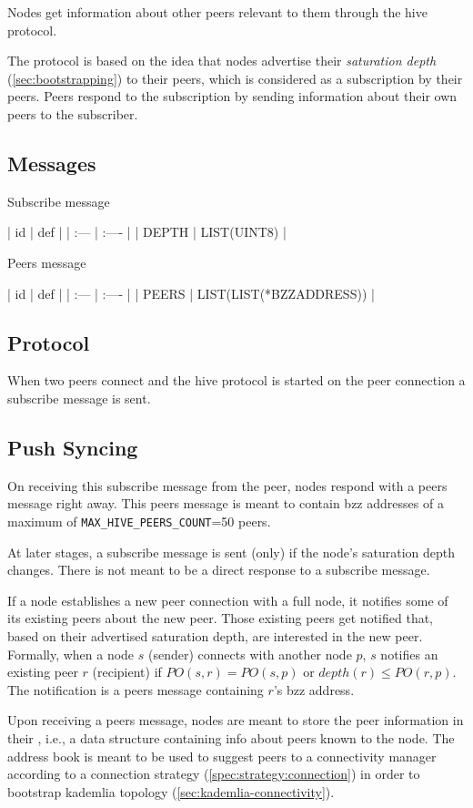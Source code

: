 
Nodes get information about other peers relevant to them through the hive protocol.

The protocol is based on the idea that nodes advertise their \emph{saturation  depth} (\ref{sec:bootstrapping}) to their peers, which is considered as a subscription by their peers. Peers respond to the subscription by sending information about their own peers to the subscriber.

\subsection{Messages}


\begin{definition}{Subscribe message}\label{def:hive-subscribe-msg}

| id | def |
| :--- | :---- |
| DEPTH | LIST(UINT8) |
\end{definition}



\begin{definition}{Peers message}\label{def:hive-peers-msg}

| id | def |
| :--- | :---- |
| PEERS | LIST(LIST(*BZZADDRESS)) |
\end{definition}

\subsection{Protocol}

When two peers connect and the hive protocol is started on the peer connection a subscribe message is sent.
\subsection{Push Syncing}\label{sec:push-syncing}

On receiving this subscribe message from the peer, nodes respond with a peers message right away. This peers message is meant to contain bzz addresses of a maximum of \texttt{MAX\_HIVE\_PEERS\_COUNT}=50 peers.

At later stages, a subscribe message is sent (only) if the node's saturation depth changes. There is not meant to be a direct response to a subscribe message.

If a node establishes a new peer connection with a full node, it notifies some of its existing peers about the new peer. Those existing peers get notified that, based on their advertised saturation depth, are interested in the new peer. 
Formally, when a node $s$ (sender) connects with another node $p$, $s$ notifies an existing peer $r$ (recipient) if $\mathit{PO}(s, r) = \mathit{PO}(s, p)$ or $\mathit{depth}(r)\leq \mathit{PO}(r, p)$. The notification is a peers message containing $r$'s bzz address.

Upon receiving a peers message, nodes are meant to store the peer information in their , i.e., a data structure containing info about peers known to the node. The address book is meant to be used to suggest peers  to a connectivity manager according to a connection strategy (\ref{spec:strategy:connection}) in order to bootstrap kademlia topology (\ref{sec:kademlia-connectivity}). 
